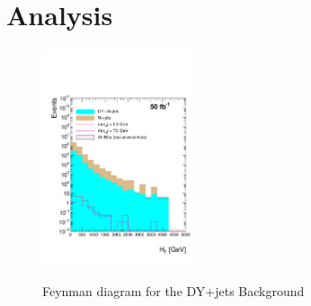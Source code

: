 \chapter{Analysis}
\label{Analysis_chapter}


 \begin{figure}[h] 
 \centering
 \caption{Feynman diagram for the DY+jets Background}
 \includegraphics[width=0.4\textwidth]{./Capitulos/Analysis/AfterBJets/HT_MET_20} 
 \label{dy_jets_feynman}
 \end{figure}